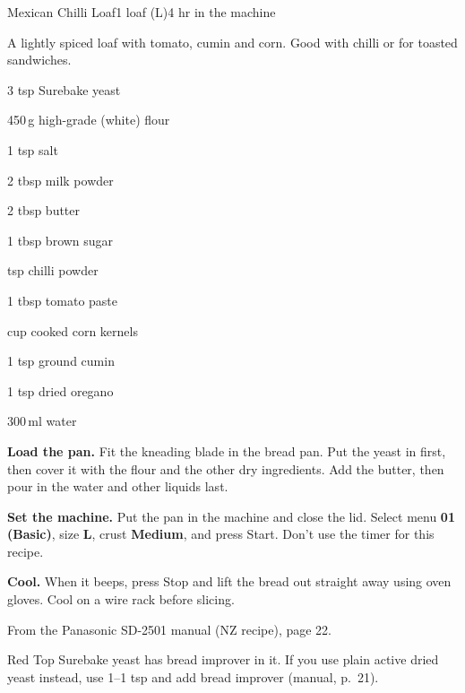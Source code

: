 \begin{recipebox}{Mexican Chilli Loaf}{1 loaf (L)}{4 hr in the machine}

A lightly spiced loaf with tomato, cumin and corn. Good with chilli or for toasted sandwiches.

\begin{ingredients}
  \item 3 tsp Surebake yeast
  \item 450\,g high-grade (white) flour
  \item 1 tsp salt
  \item 2 tbsp milk powder
  \item 2 tbsp butter
  \item 1 tbsp brown sugar
  \item {} tsp chilli powder
  \item 1 tbsp tomato paste
  \item {} cup cooked corn kernels
  \item 1 tsp ground cumin
  \item 1 tsp dried oregano
  \item 300\,ml water
\end{ingredients}

\begin{method}
  \item \textbf{Load the pan.} Fit the kneading blade in the bread pan. Put the yeast in first, then cover it with the flour and the other dry ingredients. Add the butter, then pour in the water and other liquids last.
  \item \textbf{Set the machine.} Put the pan in the machine and close the lid. Select menu \textbf{01 (Basic)}, size \textbf{L}, crust \textbf{Medium}, and press Start. Don't use the timer for this recipe.
  \item \textbf{Cool.} When it beeps, press Stop and lift the bread out straight away using oven gloves. Cool on a wire rack before slicing.
\end{method}

\begin{notelist}
  \item From the Panasonic SD-2501 manual (NZ recipe), page 22.
  \item Red Top Surebake yeast has bread improver in it. If you use plain active dried yeast instead, use 1--1 tsp and add bread improver (manual, p.~21).
\end{notelist}

\end{recipebox}

